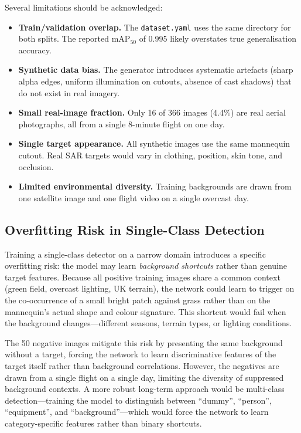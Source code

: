 \documentclass[10pt,a4paper]{article}
\begin{document}
Several limitations should be acknowledged:

\begin{itemize}
    \item \textbf{Train/validation overlap.} The \texttt{dataset.yaml} uses the same directory for both splits. The reported mAP$_{50}$ of 0.995 likely overstates true generalisation accuracy.
    \item \textbf{Synthetic data bias.} The generator introduces systematic artefacts (sharp alpha edges, uniform illumination on cutouts, absence of cast shadows) that do not exist in real imagery.
    \item \textbf{Small real-image fraction.} Only 16 of 366 images (4.4\%) are real aerial photographs, all from a single 8-minute flight on one day.
    \item \textbf{Single target appearance.} All synthetic images use the same mannequin cutout. Real SAR targets would vary in clothing, position, skin tone, and occlusion.
    \item \textbf{Limited environmental diversity.} Training backgrounds are drawn from one satellite image and one flight video on a single overcast day.
\end{itemize}

\subsection{Overfitting Risk in Single-Class Detection}

Training a single-class detector on a narrow domain introduces a specific overfitting risk: the model may learn \emph{background shortcuts} rather than genuine target features. Because all positive training images share a common context (green field, overcast lighting, UK terrain), the network could learn to trigger on the co-occurrence of a small bright patch against grass rather than on the mannequin's actual shape and colour signature. This shortcut would fail when the background changes---different seasons, terrain types, or lighting conditions.

The 50 negative images mitigate this risk by presenting the same background without a target, forcing the network to learn discriminative features of the target itself rather than background correlations. However, the negatives are drawn from a single flight on a single day, limiting the diversity of suppressed background contexts. A more robust long-term approach would be multi-class detection---training the model to distinguish between ``dummy'', ``person'', ``equipment'', and ``background''---which would force the network to learn category-specific features rather than binary shortcuts.
\end{document}
